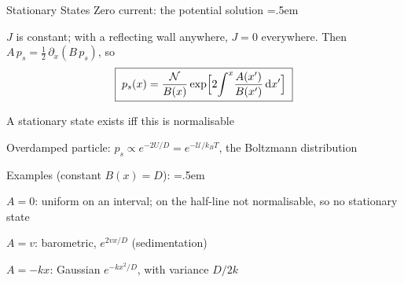 \documentclass[xcolor={dvipsnames},t]{beamer}
\let\olditemize=\itemize
\let\endolditemize=\enditemize
\renewenvironment{itemize}{\olditemize \itemsep=.5em }{\endolditemize}
\newcommand{\cU}{\mathcal{U}}
\begin{document}
\begin{frame}{Stationary States}
    \alert{Zero current: the potential solution}
    \begin{itemize}
        \item<2-> $J$ is constant; with a reflecting wall anywhere, $J=0$ everywhere. Then $A\,p_s=\tfrac12\,\partial_x(B\,p_s)$, so
        \[ \boxed{\;p_s(x) = \frac{\mathcal N}{B(x)}\exp\Bigl[2\!\int^x\!\frac{A(x')}{B(x')}\,\dd x'\Bigr]\;} \]
        \vspace{-1.5em}
        \item<3-> A stationary state exists iff this is normalisable
        \item<4-> Overdamped particle: $p_s\propto e^{-2U/D}=e^{-\cU/k_BT}$, the Boltzmann distribution
        \item<5-> Examples (constant $B(x) = D$):
        \begin{itemize}
            \item<6-> $A=0$: uniform on an interval; on the half-line not normalisable, so no stationary state
            \item<7-> $A=v$: barometric, $e^{2vx/D}$ (sedimentation)
            \item<8-> $A=-kx$: Gaussian $e^{-kx^2/D}$, with variance $D/2k$
        \end{itemize}
    \end{itemize}
\end{frame}
\end{document}
